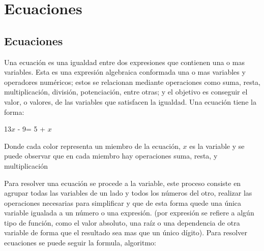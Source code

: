 \section{Ecuaciones}
\subsection{Ecuaciones}\label{Ecuaciones}
Una ecuación es una igualdad entre dos expresiones que contienen una o mas
variables.  Esta es una expresión algebraica conformada una o mas variables y
operadores numéricos; estos se relacionan mediante operaciones como
suma, resta, multiplicación, división, potenciación, entre otras; y el objetivo
es conseguir el valor, o valores, de las variables que satisfacen la igualdad.
Una ecuación tiene la forma:

 \colorbox{RojoClaro}{13$x$ - 9}= \colorbox{AzulClaro}{5 + $x$}

Donde cada color representa un miembro de la ecuación, $x$ es la variable y se
puede observar que en cada miembro hay operaciones  suma, resta, y multiplicación


Para resolver una ecuación se procede a  la variable, este
proceso consiste
en agrupar todas las variables de un lado y todos los números del otro, realizar
las operaciones necesarias para simplificar y que de esta forma quede una única
variable igualada a un número o una expresión. (por expresión se refiere a algún
tipo de función, como el valor absoluto, una raíz o una dependencia de otra variable
de forma que el resultado sea mas que un único dígito). Para resolver ecuaciones
se puede seguir la formula, algoritmo:


